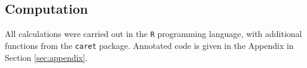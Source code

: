 \documentclass{article}\usepackage[]{graphicx}\usepackage[]{color}
\begin{document}
                                                                                                                                                                                                                                                                                                                                                                                                                                                                                                                                                                                                \subsection{Computation}
All calculations were carried out in the \texttt{R} programming language, with additional functions from the \texttt{caret} package. Annotated code is given in the Appendix in Section \ref{sec:appendix}.
\end{document}
